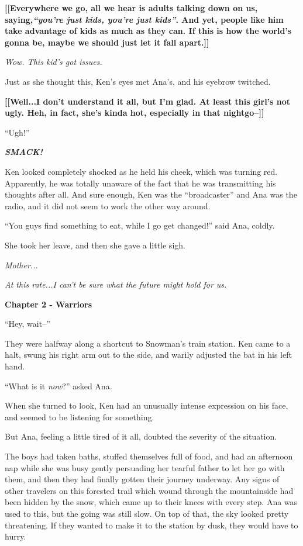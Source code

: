 \documentclass[
]{article}
\begin{document}
\textbf{{[}{[}Everywhere we go, all we hear is adults talking down on
us, saying,}\emph{\textbf{``you're just kids, you're just
kids''}}\textbf{. And yet, people like him take advantage of kids as
much as they can. If this is how the world's gonna be, maybe we should
just let it fall apart.{]}{]}}

\emph{Wow. This kid's got issues.}

Just as she thought this, Ken's eyes met Ana's, and his eyebrow
twitched.

\textbf{{[}{[}Well...I don't understand it all, but I'm glad. At least
this girl's not ugly. Heh, in fact, she's kinda hot, especially in that
nightgo--{]}{]}}

``Ugh!''

\emph{\textbf{SMACK!}}

Ken looked completely shocked as he held his cheek, which was turning
red. Apparently, he was totally unaware of the fact that he was
transmitting his thoughts after all. And sure enough, Ken was the
``broadcaster'' and Ana was the radio, and it did not seem to work the
other way around.

``You guys find something to eat, while I go get changed!'' said Ana,
coldly.

She took her leave, and then she gave a little sigh.

\emph{Mother...}

\emph{At this rate...I can't be sure what the future might hold for us.}

\textbf{Chapter 2 - Warriors}

``Hey, wait--''

They were halfway along a shortcut to Snowman's train station. Ken came
to a halt, swung his right arm out to the side, and warily adjusted the
bat in his left hand.

``What is it \emph{now}?'' asked Ana.

When she turned to look, Ken had an unusually intense expression on his
face, and seemed to be listening for something.

But Ana, feeling a little tired of it all, doubted the severity of the
situation.

The boys had taken baths, stuffed themselves full of food, and had an
afternoon nap while she was busy gently persuading her tearful father to
let her go with them, and then they had finally gotten their journey
underway. Any signs of other travelers on this forested trail which
wound through the mountainside had been hidden by the snow, which came
up to their knees with every step. Ana was used to this, but the going
was still slow. On top of that, the sky looked pretty threatening. If
they wanted to make it to the station by dusk, they would have to hurry.
\end{document}
